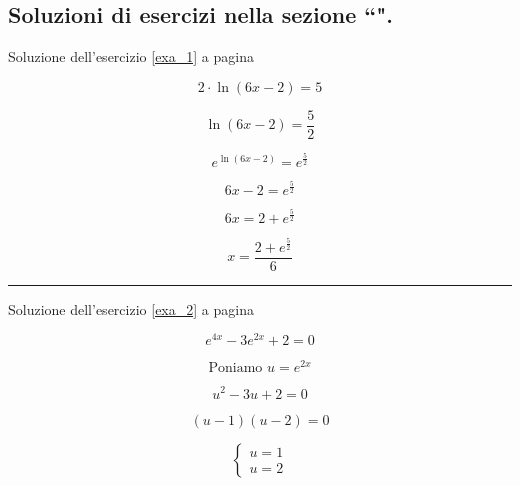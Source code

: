 \subsection{Soluzioni di esercizi nella sezione ``\textbf{}".}


Soluzione dell'esercizio \ref{exa_1} a pagina \pageref{exa_1}\label{sola_1}

\begin{equation*}
2\cdot \ln(6x - 2) = 5
\end{equation*}

\begin{equation*}
\ln(6x - 2) = \frac{5}{2}
\end{equation*}

\begin{equation*}
e^{\ln(6x - 2)} = e^{\frac{5}{2}}
\end{equation*}


\begin{equation*}
6x - 2 = e^{\frac{5}{2}}
\end{equation*}

\begin{equation*}
6x = 2+e^{\frac{5}{2}}
\end{equation*}


\begin{equation*}
x = \frac{2+e^{\frac{5}{2}}}{6}
\end{equation*}


\vspace{1cm}
\hrule
\vspace{1cm}

Soluzione dell'esercizio \ref{exa_2} a pagina \pageref{exa_2}\label{sola_2}

\begin{equation*}
e^{4x} - 3e^{2x} + 2 = 0
\end{equation*}


\begin{equation*}
\textrm{Poniamo }u=e^{2x}
\end{equation*}


\begin{equation*}
u^2-3u+2=0
\end{equation*}


\begin{equation*}
(u - 1)(u - 2) =0
\end{equation*}

\begin{equation*}
\left\{
\begin{array}{ll}
u=1 \\
u=2
\end{array}
\right.
\end{equation*}

